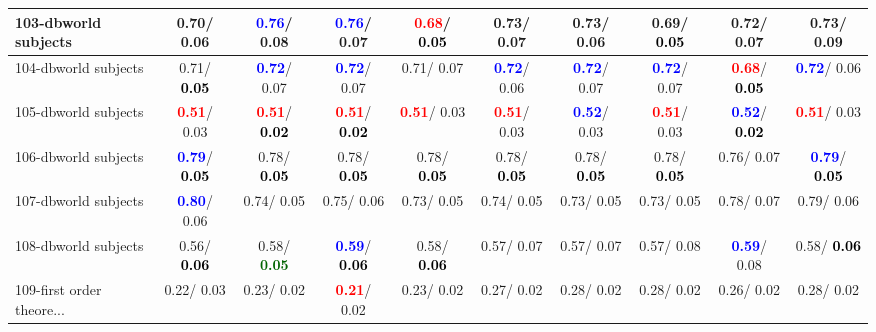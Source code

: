 \begin{table}[h]
\begin{center}
{\begin{tabular}{lc|c|c|c|c|c|c|c|c}
103-dbworld subjects &   0.70/  0.06 & \textcolor{blue}{\textbf{  0.76}}/  0.08 & \textcolor{blue}{\textbf{  0.76}}/  0.07 & \textcolor{red}{\textbf{  0.68}}/\textcolor{black}{\textbf{  0.05}} &   0.73/  0.07 &   0.73/  0.06 &   0.69/\textcolor{black}{\textbf{  0.05}} &   0.72/  0.07 &   0.73/  0.09 \\ \hline
104-dbworld subjects &   0.71/\textcolor{black}{\textbf{  0.05}} & \textcolor{blue}{\textbf{  0.72}}/  0.07 & \textcolor{blue}{\textbf{  0.72}}/  0.07 &   0.71/  0.07 & \textcolor{blue}{\textbf{  0.72}}/  0.06 & \textcolor{blue}{\textbf{  0.72}}/  0.07 & \textcolor{blue}{\textbf{  0.72}}/  0.07 & \textcolor{red}{\textbf{  0.68}}/\textcolor{black}{\textbf{  0.05}} & \textcolor{blue}{\textbf{  0.72}}/  0.06 \\
105-dbworld subjects & \textcolor{red}{\textbf{  0.51}}/  0.03 & \textcolor{red}{\textbf{  0.51}}/\textcolor{black}{\textbf{  0.02}} & \textcolor{red}{\textbf{  0.51}}/\textcolor{black}{\textbf{  0.02}} & \textcolor{red}{\textbf{  0.51}}/  0.03 & \textcolor{red}{\textbf{  0.51}}/  0.03 & \textcolor{blue}{\textbf{  0.52}}/  0.03 & \textcolor{red}{\textbf{  0.51}}/  0.03 & \textcolor{blue}{\textbf{  0.52}}/\textcolor{black}{\textbf{  0.02}} & \textcolor{red}{\textbf{  0.51}}/  0.03 \\
106-dbworld subjects & \textcolor{blue}{\textbf{  0.79}}/\textcolor{black}{\textbf{  0.05}} &   0.78/\textcolor{black}{\textbf{  0.05}} &   0.78/\textcolor{black}{\textbf{  0.05}} &   0.78/\textcolor{black}{\textbf{  0.05}} &   0.78/\textcolor{black}{\textbf{  0.05}} &   0.78/\textcolor{black}{\textbf{  0.05}} &   0.78/\textcolor{black}{\textbf{  0.05}} &   0.76/  0.07 & \textcolor{blue}{\textbf{  0.79}}/\textcolor{black}{\textbf{  0.05}} \\
107-dbworld subjects & \textcolor{blue}{\textbf{  0.80}}/  0.06 &   0.74/  0.05 &   0.75/  0.06 &   0.73/  0.05 &   0.74/  0.05 &   0.73/  0.05 &   0.73/  0.05 &   0.78/  0.07 &   0.79/  0.06 \\
108-dbworld subjects &   0.56/\textcolor{black}{\textbf{  0.06}} &   0.58/\textcolor{darkgreen}{\textbf{  0.05}} & \textcolor{blue}{\textbf{  0.59}}/\textcolor{black}{\textbf{  0.06}} &   0.58/\textcolor{black}{\textbf{  0.06}} &   0.57/  0.07 &   0.57/  0.07 &   0.57/  0.08 & \textcolor{blue}{\textbf{  0.59}}/  0.08 &   0.58/\textcolor{black}{\textbf{  0.06}} \\
109-first order theore... &   0.22/  0.03 &   0.23/  0.02 & \textcolor{red}{\textbf{  0.21}}/  0.02 &   0.23/  0.02 &   0.27/  0.02 &   0.28/  0.02 &   0.28/  0.02 &   0.26/  0.02 &   0.28/  0.02 \\

\end{tabular}}
\end{center}
\end{table}
